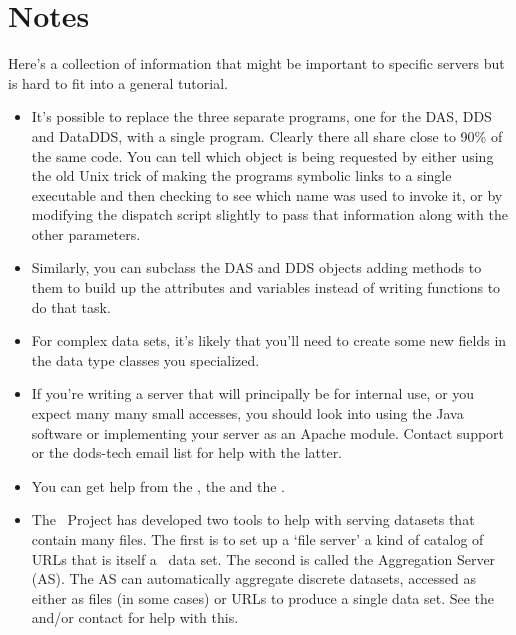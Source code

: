 \documentclass{dods-paper}
\begin{document}
\section{Notes}

Here's a collection of information that might be important to specific
servers but is hard to fit into a general tutorial.

\begin{itemize}

\item It's possible to replace the three separate programs, one for the DAS,
  DDS and DataDDS, with a single program. Clearly there all share close to
  90\% of the same code. You can tell which object is being requested by
  either using the old Unix trick of making the programs symbolic links to a
  single executable and then checking to see which name was used to invoke
  it, or by modifying the dispatch script slightly to pass that information
  along with the other parameters.

\item Similarly, you can subclass the DAS and DDS objects adding methods to
  them to build up the attributes and variables instead of writing functions
  to do that task. 

\item For complex data sets, it's likely that you'll need to create some new
  fields in the data type classes you specialized.

\item If you're writing a server that will principally be for internal use, or
  you expect many many small accesses, you should look into using the Java
  software or implementing your server as an Apache module. Contact support
  or the dods-tech email list for help with the latter.
  
\item You can get help from the , the 
  and the .
  
\item The \opendap\ Project has developed two tools to help with serving datasets
  that contain many files. The first is to set up a `file server' a kind of
  catalog of URLs that is itself a \opendap\ data set. The second is called the
  Aggregation Server (AS). The AS can automatically aggregate discrete
  datasets, accessed as either as files (in some cases) or URLs to produce a
  single data set. See the  and/or contact  for help with this.


\end{itemize}
\end{document}
